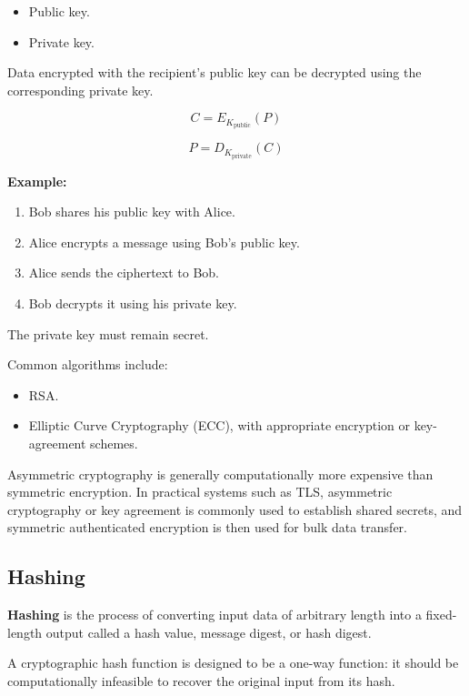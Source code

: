 \begin{itemize}
\item Public key.
\item Private key.
\end{itemize}

Data encrypted with the recipient's public key can be decrypted using the corresponding private key.



\[
C=E_{K_{\text{public}}}(P)
\]





\[
P=D_{K_{\text{private}}}(C)
\]



\textbf{Example:}

\begin{enumerate}
\item Bob shares his public key with Alice.
\item Alice encrypts a message using Bob's public key.
\item Alice sends the ciphertext to Bob.
\item Bob decrypts it using his private key.
\end{enumerate}

The private key must remain secret.

Common algorithms include:

\begin{itemize}
\item RSA.
\item Elliptic Curve Cryptography (ECC), with appropriate encryption or key-agreement schemes.
\end{itemize}

Asymmetric cryptography is generally computationally more expensive than symmetric encryption. In practical systems such as TLS, asymmetric cryptography or key agreement is commonly used to establish shared secrets, and symmetric authenticated encryption is then used for bulk data transfer.

\subsection{Hashing}

\textbf{Hashing} is the process of converting input data of arbitrary length into a fixed-length output called a hash value, message digest, or hash digest.

A cryptographic hash function is designed to be a one-way function: it should be computationally infeasible to recover the original input from its hash.



